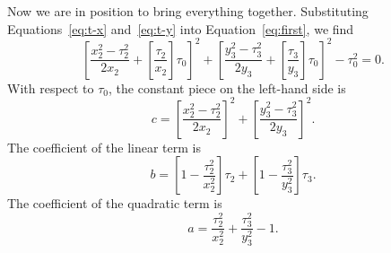 \documentclass[twocolumn]{article}
\begin{document}
Now we are in position to bring everything together. Substituting
Equations~\ref{eq:t-x} and~\ref{eq:t-y} into Equation~\ref{eq:first}, we find
\begin{equation}
   \left[\frac{x_2^2 - \tau_2^2}{2 x_2} + \left[\frac{\tau_2}{x_2}\right]
   \tau_0\right]^2
   + \left[\frac{y_3^2 - \tau_3^2}{2 y_3} + \left[\frac{\tau_3}{y_3}\right]
   \tau_0\right]^2 - \tau_0^2 = 0.
\end{equation}
With respect to $\tau_0$, the constant piece on the left-hand side is
\begin{equation}
   c = \left[\frac{x_2^2 - \tau_2^2}{2 x_2}\right]^2 + \left[\frac{y_3^2 -
   \tau_3^2}{2 y_3}\right]^2.
\end{equation}
The coefficient of the linear term is
\begin{equation}
   b = \left[1 - \frac{\tau_2^2}{x_2^2}\right] \tau_2 + \left[1 -
   \frac{\tau_3^2}{y_3^2}\right] \tau_3.
\end{equation}
The coefficient of the quadratic term is
\begin{equation}
   a = \frac{\tau_2^2}{x_2^2} + \frac{\tau_3^2}{y_3^2} - 1.
\end{equation}

%
%
%
%

\newpage


\end{document}
